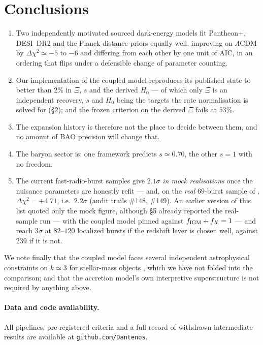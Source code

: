 \documentclass[11pt,a4paper]{article}
\begin{document}
\section{Conclusions}

\begin{enumerate}\itemsep3pt
\item Two independently motivated sourced dark-energy models fit Pantheon+, DESI~DR2 and the Planck
distance priors equally well, improving on $\Lambda$CDM by $\Delta\chi^2 \simeq -5$ to $-6$ and
differing from each other by one unit of AIC, in an ordering that flips under a defensible change
of parameter counting.
\item Our implementation of the coupled model reproduces its published state to better than $2\%$
in $\Xi$, $s$ and the derived $H_0$ --- of which only $\Xi$ is an independent recovery, $s$ and $H_0$ being the targets the rate normalisation is solved for (\S2); and the frozen criterion on the derived $\Xi$ fails at $53\%$.
\item The expansion history is therefore not the place to decide between them, and no amount of
BAO precision will change that.
\item The baryon sector is: one framework predicts $s \simeq 0.70$, the other $s = 1$ with no
freedom.
\item The current fast-radio-burst samples give $2.1\sigma$ \emph{in mock realisations} once the nuisance parameters are honestly refit --- and, on the \emph{real} $69$-burst sample of \citet{Connor2025}, $\Delta\chi^2 = +4.71$, i.e.\ $2.2\sigma$ (audit trails \#148, \#149). An earlier version of this list quoted only the mock figure, although \S5 already reported the real-sample run --- with the coupled model pinned against $f_{\rm IGM}+f_X = 1$ --- and reach $3\sigma$ at $82$--$120$
localized bursts if the redshift lever is chosen well, against $239$ if it is not.
\end{enumerate}

We note finally that the coupled model faces several independent astrophysical constraints on
$k \simeq 3$ for stellar-mass objects \citep{AndraeElBadry2023,Rodriguez2023,Lei2024,Lacy2024,Calza2024},
which we have not folded into the comparison; and that the accretion model's own interpretive
superstructure is not required by anything above.

\paragraph{Data and code availability.} All pipelines, pre-registered criteria and a full record of
withdrawn intermediate results are available at \texttt{github.com/Dantenos}.
\end{document}
